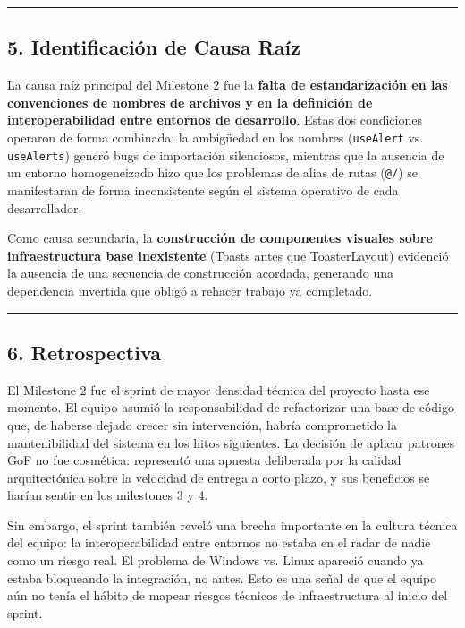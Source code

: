 \documentclass[11pt,a4paper]{article}
\begin{document}
\vspace{0.6em}\hrule\vspace{0.8em}

\subsection{5. Identificación de Causa Raíz}

La causa raíz principal del Milestone 2 fue la \textbf{falta de estandarización en las convenciones de nombres de archivos y en la definición de interoperabilidad entre entornos de desarrollo}. Estas dos condiciones operaron de forma combinada: la ambigüedad en los nombres (\texttt{useAlert} vs. \texttt{useAlerts}) generó bugs de importación silenciosos, mientras que la ausencia de un entorno homogeneizado hizo que los problemas de alias de rutas (\texttt{@/}) se manifestaran de forma inconsistente según el sistema operativo de cada desarrollador.

Como causa secundaria, la \textbf{construcción de componentes visuales sobre infraestructura base inexistente} (Toasts antes que ToasterLayout) evidenció la ausencia de una secuencia de construcción acordada, generando una dependencia invertida que obligó a rehacer trabajo ya completado.

\vspace{0.6em}\hrule\vspace{0.8em}

\subsection{6. Retrospectiva}

El Milestone 2 fue el sprint de mayor densidad técnica del proyecto hasta ese momento. El equipo asumió la responsabilidad de refactorizar una base de código que, de haberse dejado crecer sin intervención, habría comprometido la mantenibilidad del sistema en los hitos siguientes. La decisión de aplicar patrones GoF no fue cosmética: representó una apuesta deliberada por la calidad arquitectónica sobre la velocidad de entrega a corto plazo, y sus beneficios se harían sentir en los milestones 3 y 4.

Sin embargo, el sprint también reveló una brecha importante en la cultura técnica del equipo: la interoperabilidad entre entornos no estaba en el radar de nadie como un riesgo real. El problema de Windows vs. Linux apareció cuando ya estaba bloqueando la integración, no antes. Esto es una señal de que el equipo aún no tenía el hábito de mapear riesgos técnicos de infraestructura al inicio del sprint.
\end{document}
